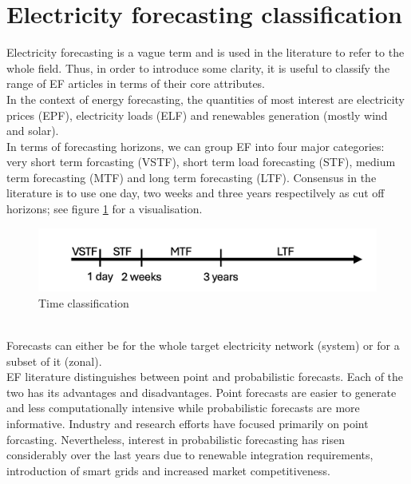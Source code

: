 \section{Electricity forecasting classification}
Electricity forecasting is a vague term and is used in the literature to refer to the whole field. Thus, in order to introduce some clarity, it is useful to classify the range of EF articles in terms of their core attributes.
\\
In the context of energy forecasting, the quantities of most interest are electricity prices (EPF), electricity loads (ELF) and renewables generation (mostly wind and solar).
\\
In terms of forecasting horizons, we can group EF into four major categories: very short term forcasting (VSTF), short term load forecasting (STF), medium term forecasting (MTF) and long term forecasting (LTF). Consensus in the literature is to use one day, two weeks and three years respectilvely \cite{hong_phd} as cut off horizons; see figure \ref{fig:time} for a visualisation. 
\begin{figure}
  \includegraphics[width=\textwidth]{images/time_2.png}
  \caption{Time classification \cite{prob_elf}}
  \label{fig:time}
\end{figure}
\\
Forecasts can either be for the whole target electricity network (system) or for a subset of it (zonal).
\\
EF literature distinguishes between point and probabilistic forecasts. Each of the two has its advantages and disadvantages. Point forecasts are easier to generate and less computationally intensive while probabilistic forecasts are more informative. Industry and research efforts have focused primarily on point forcasting. Nevertheless, interest in probabilistic forecasting has risen considerably over the last years due to renewable integration requirements, introduction of smart grids and increased market competitiveness.
